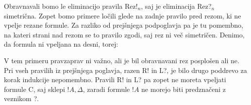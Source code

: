 Obravnavali bomo le eliminacijo pravila Rez!$_n$, saj je eliminacija Rez?$_n$ simetrična. Zopet bomo primere ločili glede na zadnje pravilo pred rezom, ki ne vpelje rezane formule. Za razliko od prejšnjega podpoglavja pa je tu pomembno, na kateri strani nad rezom se to pravilo zgodi, saj rez ni več simetričen. Denimo, da formula ni vpeljana na desni, torej:
\begin{prooftree}
\end{prooftree}
V tem primeru pravzaprav ni važno, ali je bil obravnavani rez posplošen ali ne. Pri vseh pravilih iz prejšnjega poglavja, razen R! in L?, je bilo drugo poddrevo za korak indukcije nepomembno. Pravili R! in L? pa zopet ne moreta vpeljati formule C, saj sklepi $!A,\Delta$, zaradi formule $!A$ ne morejo biti predznačeni z veznikom ?.

